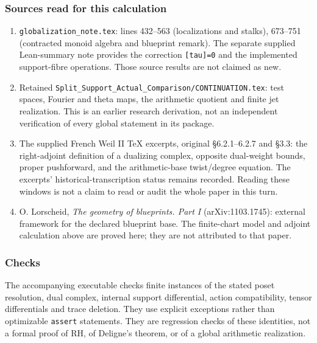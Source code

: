 \subsubsection{Sources read for this calculation}\label{endpoint-tau_base--sources-read-for-this-calculation}

\begin{enumerate}
\def\labelenumi{\arabic{enumi}.}
\tightlist
\item
  \nolinkurl{globalization_note.tex}: lines 432--563 (localizations and stalks), 673--751 (contracted monoid algebra and blueprint remark). The separate supplied Lean-summary note provides the correction \texttt{{[}tau{]}=0} and the implemented support-fibre operations. Those source results are not claimed as new.
\item
  Retained \nolinkurl{Split_Support_Actual_Comparison/CONTINUATION.tex}: test spaces, Fourier and theta maps, the arithmetic quotient and finite jet realization. This is an earlier research derivation, not an independent verification of every global statement in its package.
\item
  The supplied French Weil II TeX excerpts, original §6.2.1--6.2.7 and §3.3: the right-adjoint definition of a dualizing complex, opposite dual-weight bounds, proper pushforward, and the arithmetic-base twist/degree equation. The excerpts' historical-transcription status remains recorded. Reading these windows is not a claim to read or audit the whole paper in this turn.
\item
  O. Lorscheid, \emph{The geometry of blueprints. Part I} (arXiv:1103.1745): external framework for the declared blueprint base. The finite-chart model and adjoint calculation above are proved here; they are not attributed to that paper.
\end{enumerate}

\subsubsection{Checks}\label{endpoint-tau_base--checks}

The accompanying executable checks finite instances of the stated poset resolution, dual complex, internal support differential, action compatibility, tensor differentials and trace deletion. They use explicit exceptions rather than optimizable \nolinkurl{assert} statements. They are regression checks of these identities, not a formal proof of RH, of Deligne's theorem, or of a global arithmetic realization.

\endgroup


\endgroup
